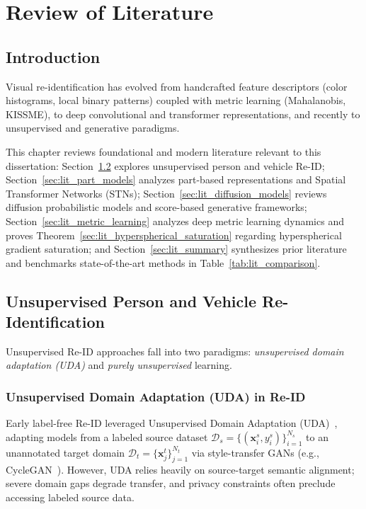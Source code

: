 \chapter{Review of Literature}
\label{chap:literature}

\section{Introduction}
\label{sec:lit_intro}

Visual re-identification has evolved from handcrafted feature descriptors (color histograms, local binary patterns) coupled with metric learning (Mahalanobis, KISSME), to deep convolutional and transformer representations, and recently to unsupervised and generative paradigms.

This chapter reviews foundational and modern literature relevant to this dissertation: Section~\ref{sec:lit_unsupervised_reid} explores unsupervised person and vehicle Re-ID; Section~\ref{sec:lit_part_models} analyzes part-based representations and Spatial Transformer Networks (STNs); Section~\ref{sec:lit_diffusion_models} reviews diffusion probabilistic models and score-based generative frameworks; Section~\ref{sec:lit_metric_learning} analyzes deep metric learning dynamics and proves Theorem~\ref{sec:lit_hyperspherical_saturation} regarding hyperspherical gradient saturation; and Section~\ref{sec:lit_summary} synthesizes prior literature and benchmarks state-of-the-art methods in Table~\ref{tab:lit_comparison}.

\section{Unsupervised Person and Vehicle Re-Identification}
\label{sec:lit_unsupervised_reid}

Unsupervised Re-ID approaches fall into two paradigms: \textit{unsupervised domain adaptation (UDA)} and \textit{purely unsupervised} learning.

\subsection{Unsupervised Domain Adaptation (UDA) in Re-ID}
\label{subsec:uda_reid}

Early label-free Re-ID leveraged Unsupervised Domain Adaptation (UDA)~\cite{zheng2017unlabeled,ge2020selfpaced}, adapting models from a labeled source dataset $\mathcal{D}_s = \{(\mathbf{x}_i^s, y_i^s)\}_{i=1}^{N_s}$ to an unannotated target domain $\mathcal{D}_t = \{\mathbf{x}_j^t\}_{j=1}^{N_t}$ via style-transfer GANs (e.g., CycleGAN~\cite{zheng2017unlabeled}). However, UDA relies heavily on source-target semantic alignment; severe domain gaps degrade transfer, and privacy constraints often preclude accessing labeled source data.

